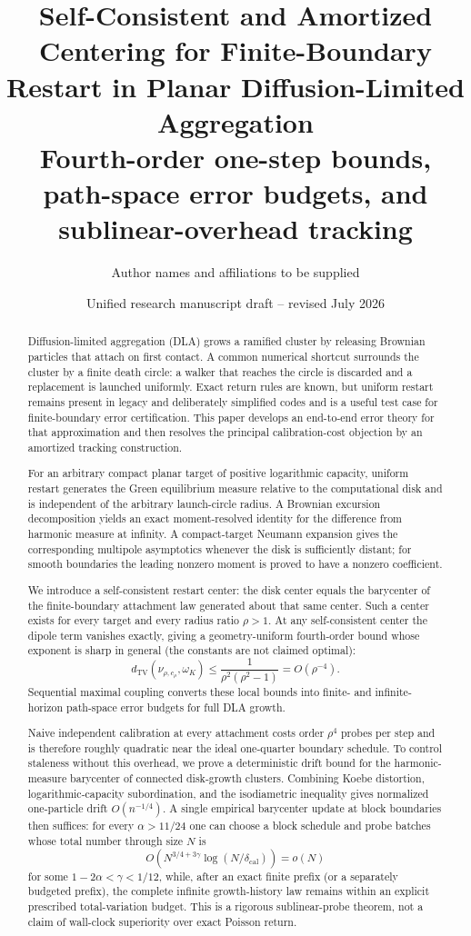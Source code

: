 \documentclass[11pt]{article}
\title{\vspace{-1.0cm}\textbf{Self-Consistent and Amortized Centering for Finite-Boundary Restart in Planar Diffusion-Limited Aggregation}\\[0.45em]
\large Fourth-order one-step bounds, path-space error budgets, and sublinear-overhead tracking}
\author{Author names and affiliations to be supplied}
\date{Unified research manuscript draft -- revised July 2026}
\theoremstyle{mainthm}
\theoremstyle{definition}
\theoremstyle{remark}
\newcommand{\dTV}{d_{\mathrm{TV}}}
\begin{document}
\maketitle

\begin{abstract}
Diffusion-limited aggregation (DLA) grows a ramified cluster by releasing Brownian particles that attach on first contact. A common numerical shortcut surrounds the cluster by a finite death circle: a walker that reaches the circle is discarded and a replacement is launched uniformly. Exact return rules are known, but uniform restart remains present in legacy and deliberately simplified codes and is a useful test case for finite-boundary error certification. This paper develops an end-to-end error theory for that approximation and then resolves the principal calibration-cost objection by an amortized tracking construction.

For an arbitrary compact planar target of positive logarithmic capacity, uniform restart generates the Green equilibrium measure relative to the computational disk and is independent of the arbitrary launch-circle radius. A Brownian excursion decomposition yields an exact moment-resolved identity for the difference from harmonic measure at infinity. A compact-target Neumann expansion gives the corresponding multipole asymptotics whenever the disk is sufficiently distant; for smooth boundaries the leading nonzero moment is proved to have a nonzero coefficient.

We introduce a self-consistent restart center: the disk center equals the barycenter of the finite-boundary attachment law generated about that same center. Such a center exists for every target and every radius ratio $\rho>1$. At any self-consistent center the dipole term vanishes exactly, giving a geometry-uniform fourth-order bound whose exponent is sharp in general (the constants are not claimed optimal):
\[
  \dTV(\nu_{\rho,c_\rho},\omega_K)
  \le \frac{1}{\rho^2(\rho^2-1)}
  =O(\rho^{-4}).
\]
Sequential maximal coupling converts these local bounds into finite- and infinite-horizon path-space error budgets for full DLA growth.

Naive independent calibration at every attachment costs order $\rho^4$ probes per step and is therefore roughly quadratic near the ideal one-quarter boundary schedule. To control staleness without this overhead, we prove a deterministic drift bound for the harmonic-measure barycenter of connected disk-growth clusters. Combining Koebe distortion, logarithmic-capacity subordination, and the isodiametric inequality gives normalized one-particle drift $O(n^{-1/4})$. A single empirical barycenter update at block boundaries then suffices: for every $\alpha>11/24$ one can choose a block schedule and probe batches whose total number through size $N$ is
\[
  O\!\left(N^{3/4+3\gamma}\log(N/\delta_{\mathrm{cal}})\right)=o(N)
\]
for some $1-2\alpha<\gamma<1/12$, while, after an exact finite prefix (or a separately budgeted prefix), the complete infinite growth-history law remains within an explicit prescribed total-variation budget. This is a rigorous sublinear-probe theorem, not a claim of wall-clock superiority over exact Poisson return.
\end{abstract}
\end{document}
